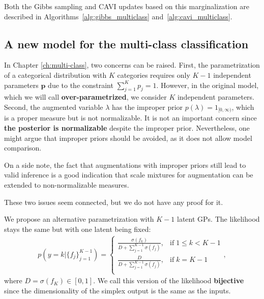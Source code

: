 Both the Gibbs sampling and \ac{CAVI} updates based on this marginalization are described in Algorithms~\ref{alg:gibbs_multiclass} and~\ref{alg:cavi_multiclass}.


\subsection{A new model for the multi-class classification}
\label{sec:simplex}
In Chapter \ref{ch:multi-class}, two concerns can be raised.
First, the parametrization of a categorical distribution with $K$ categories requires only $K-1$ independent parameters $\boldsymbol{p}$ due to the constraint $\sum_{j=1}^K p_j = 1$.
However, in the original model, which we will call \textbf{over-parametrized}, we consider $K$ independent parameters.
Second, the augmented variable $\lambda$ has the improper prior $p(\lambda) = 1_{[0,\infty)}$, which is a proper measure but is not normalizable.
It is not an important concern since \textbf{the posterior is normalizable} despite the improper prior.
Nevertheless, one might argue that improper priors should be avoided, as it does not allow model comparison.

On a side note, the fact that augmentations with improper priors still lead to valid inference is a good indication that scale mixtures for augmentation can be extended to non-normalizable measures.

These two issues seem connected, but we do not have any proof for it.

We propose an alternative parametrization with $K-1$ latent \acp{GP}.
The likelihood stays the same but with one latent being fixed:
\begin{align}
    p(y=k|\{f_j\}_{j=1}^{K-1}) = \left\{
        \begin{array}{cc}
            \frac{\sigma(f_k)}{D + \sum_{j=1}^{K-1}\sigma(f_j)}, & \mathrm{if}\; 1 \leq k < K - 1\\
            \frac{D}{D + \sum_{j=1}^{K-1}\sigma(f_j)}, & \mathrm{if}\; k = K - 1 \\
    \end{array}
    \right.,\label{eq:simplex_multiclass}
\end{align}
where $D = \sigma(f_K) \in [0, 1]$.
We call this version of the likelihood \textbf{bijective} since the dimensionality of the simplex output is the same as the inputs.

